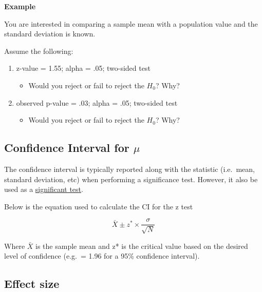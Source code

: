 \documentclass[
]{article}
\providecommand{\tightlist}{%
  \setlength{\itemsep}{0pt}\setlength{\parskip}{0pt}}
\begin{document}
\textbf{Example}

You are interested in comparing a sample mean with a population value and the standard deviation is known.

Assume the following:

\begin{enumerate}
\def\labelenumi{\arabic{enumi}.}
\item
  z-value = 1.55; alpha = .05; two-sided test

  \begin{itemize}
  \tightlist
  \item
    Would you reject or fail to reject the \(H_0\)? Why?
  \end{itemize}
\item
  observed p-value = .03; alpha = .05; two-sided test

  \begin{itemize}
  \tightlist
  \item
    Would you reject or fail to reject the \(H_0\)? Why?
  \end{itemize}
\end{enumerate}

\hypertarget{confidence-interval-for-mu}{%
\subsection{\texorpdfstring{Confidence Interval for \(\mu\)}{Confidence Interval for \textbackslash mu}}\label{confidence-interval-for-mu}}

The confidence interval is typically reported along with the statistic (i.e.~mean, standard deviation, etc) when performing a significance test. However, it also be used as a \href{https://statkat.com/confidence-interval-as-test/one-sample-z-test.php}{significant test}.

Below is the equation used to calculate the CI for the z test

\begin{equation} 
\bar{X} \pm z^* \times \dfrac{\sigma}{\sqrt{N}}
\label{eq:confidence-interval}
\end{equation}

Where \(\bar{X}\) is the sample mean and z* is the critical value based on the desired level of confidence (e.g.~= 1.96 for a 95\% confidence interval).

\hypertarget{effect-size}{%
\subsection{Effect size}\label{effect-size}}
\end{document}
